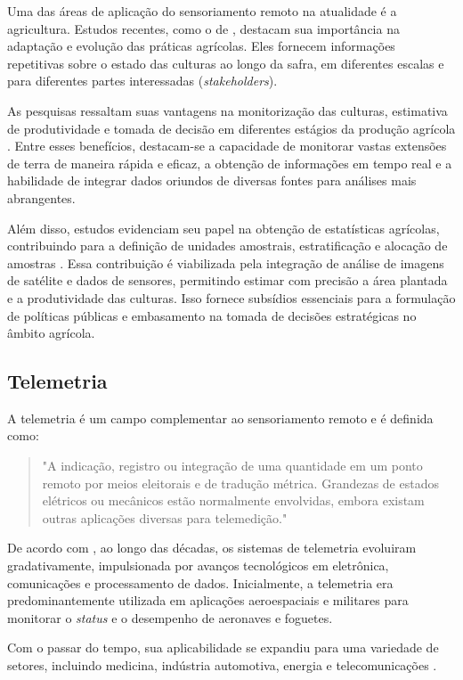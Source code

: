 Uma das áreas de aplicação do sensoriamento remoto na atualidade é a agricultura. Estudos recentes, como o de \textcite{weiss2020}, destacam sua importância na adaptação e evolução das práticas agrícolas. Eles fornecem informações repetitivas sobre o estado das culturas ao longo da safra, em diferentes escalas e para diferentes partes interessadas (\textit{stakeholders}).

As pesquisas ressaltam suas vantagens na monitorização das culturas, estimativa de produtividade e tomada de decisão em diferentes estágios da produção agrícola \parencite{shanmugapriya2019, khanal2020}. Entre esses benefícios, destacam-se a capacidade de monitorar vastas extensões de terra de maneira rápida e eficaz, a obtenção de informações em tempo real e a habilidade de integrar dados oriundos de diversas fontes para análises mais abrangentes.

Além disso, estudos evidenciam seu papel na obtenção de estatísticas agrícolas, contribuindo para a definição de unidades amostrais, estratificação e alocação de amostras \parencite{carfagna2005}. Essa contribuição é viabilizada pela integração de análise de imagens de satélite e dados de sensores, permitindo estimar com precisão a área plantada e a produtividade das culturas. Isso fornece subsídios essenciais para a formulação de políticas públicas e embasamento na tomada de decisões estratégicas no âmbito agrícola.

\subsection{Telemetria}
A telemetria é um campo complementar ao sensoriamento remoto e é definida como:
\begin{quote}
"A indicação, registro ou integração de uma quantidade em um ponto remoto por meios eleitorais e de tradução métrica.  Grandezas de estados elétricos ou mecânicos estão normalmente envolvidas, embora existam outras aplicações diversas para telemedição." \parencite{telemetering1941}
\end{quote}

De acordo com \textcite{telemetry_systems2002}, ao longo das décadas, os sistemas de telemetria evoluiram gradativamente, impulsionada por avanços tecnológicos em eletrônica, comunicações e processamento de dados. Inicialmente, a telemetria era predominantemente utilizada em aplicações aeroespaciais e militares para monitorar o \textit{status} e o desempenho de aeronaves e foguetes. 

Com o passar do tempo, sua aplicabilidade se expandiu para uma variedade de setores, incluindo medicina, indústria automotiva, energia e telecomunicações \parencite{Lizhuang_telemetry2021, Hassanien2020, Ding_telemetry2017}.

